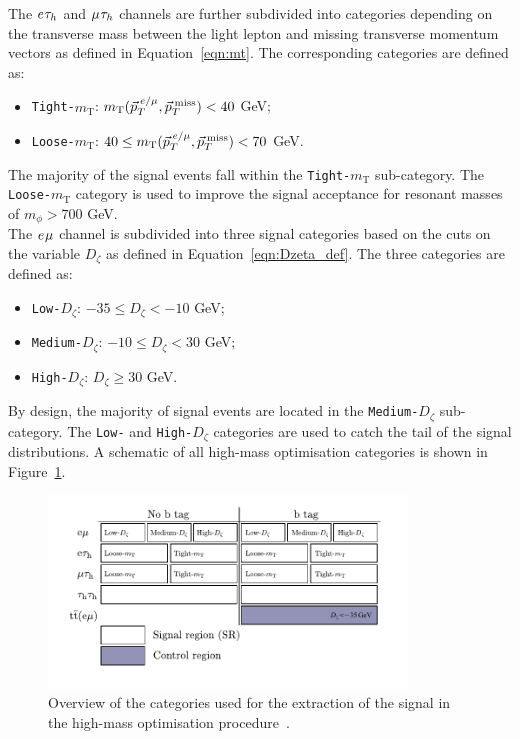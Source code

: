 The $e_{}\tau_{h}$ and $\mu_{}\tau_{h}$ channels are further subdivided into categories depending on the transverse mass between the light lepton and missing transverse momentum vectors as defined in Equation~\ref{eqn:mt}.
The corresponding categories are defined as:
\begin{itemize}
\item \texttt{Tight-$m_{\text{T}}$}: $m_{\text{T}}(\vec{p}_{T}^{\hspace{2pt}e/\mu},\vec{p}_{T}^{\hspace{2pt}\text{miss}}) < 40$ GeV;
\item \texttt{Loose-$m_{\text{T}}$}: $40 \leq m_{\text{T}}(\vec{p}_{T}^{\hspace{2pt}e/\mu},\vec{p}_{T}^{\hspace{2pt}\text{miss}}) < 70$ GeV.
\end{itemize}
The majority of the signal events fall within the \texttt{Tight-$m_{\text{T}}$} sub-category.
The \texttt{Loose-$m_{\text{T}}$} category is used to improve the signal acceptance for resonant masses of $m_{\phi} > 700$ GeV.\\

The $e_{}\mu_{}$ channel is subdivided into three signal categories based on the cuts on the variable $D_{\zeta}$ as defined in Equation~\ref{eqn:Dzeta_def}.
The three categories are defined as:
\begin{itemize}
\item \texttt{Low-$D_\zeta$}: $-35 \leq D_\zeta < -10$ GeV;
\item \texttt{Medium-$D_\zeta$}: $-10 \leq D_\zeta <  30$ GeV;
\item \texttt{High-$D_\zeta$}: $D_\zeta \geq 30$ GeV.
\end{itemize}
By design, the majority of signal events are located in the \texttt{Medium-$D_\zeta$} sub-category.
The \texttt{Low-} and \texttt{High-$D_\zeta$} categories are used to catch the tail of the signal distributions.
A schematic of all high-mass optimisation categories is shown in Figure~\ref{fig:high_mass_categories}. \\

\begin{figure}[!hbtp]
\centering
    \includegraphics[width=0.85\textwidth]{Figures/high_mass_categories.pdf}
\caption[Diagram of the categories in the high-mass optimisation procedure.]{Overview of the categories used for the extraction of the signal in the high-mass optimisation procedure~\cite{CMS:2022rbd}.}
\label{fig:high_mass_categories}
\end{figure}

